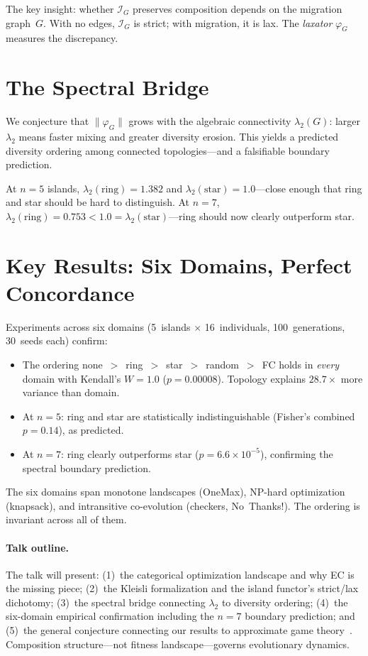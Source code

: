 \documentclass[submission,copyright,creativecommons]{eptcs}
\begin{document}
The key insight: whether $\mathcal{I}_G$ preserves composition depends on
the migration graph~$G$. With no edges, $\mathcal{I}_G$ is strict; with
migration, it is lax. The \emph{laxator} $\varphi_G$ measures the
discrepancy.

\section{The Spectral Bridge}

We conjecture that $\|\varphi_G\|$ grows with the algebraic connectivity
$\lambda_2(G)$: larger $\lambda_2$ means faster mixing and greater
diversity erosion. This yields a predicted diversity ordering among
connected topologies---and a falsifiable boundary prediction.

At $n{=}5$ islands, $\lambda_2(\text{ring}) = 1.382$ and
$\lambda_2(\text{star}) = 1.0$---close enough that ring and star should be
hard to distinguish. At $n{=}7$, $\lambda_2(\text{ring}) = 0.753 < 1.0 =
\lambda_2(\text{star})$---ring should now clearly outperform star.

\section{Key Results: Six Domains, Perfect Concordance}

Experiments across six domains (5~islands $\times$ 16~individuals,
100~generations, 30~seeds each) confirm:
\begin{itemize}
\item The ordering none~$>$~ring~$>$~star~$>$~random~$>$~FC holds in
  \emph{every} domain with Kendall's $W = 1.0$ ($p = 0.00008$).
  Topology explains $28.7\times$ more variance than domain.
\item At $n{=}5$: ring and star are statistically indistinguishable
  (Fisher's combined $p = 0.14$), as predicted.
\item At $n{=}7$: ring clearly outperforms star
  ($p = 6.6 \times 10^{-5}$), confirming the spectral boundary prediction.
\end{itemize}

The six domains span monotone landscapes (OneMax), NP-hard optimization
(knapsack), and intransitive co-evolution (checkers, No~Thanks!). The
ordering is invariant across all of them.

\paragraph{Talk outline.}
The talk will present: (1)~the categorical optimization landscape and why
EC is the missing piece; (2)~the Kleisli formalization and the island
functor's strict/lax dichotomy; (3)~the spectral bridge connecting
$\lambda_2$ to diversity ordering; (4)~the six-domain empirical
confirmation including the $n{=}7$ boundary prediction; and (5)~the
general conjecture connecting our results to approximate game
theory~\cite{ghani2025approximate}. Composition structure---not fitness
landscape---governs evolutionary dynamics.



\end{document}
